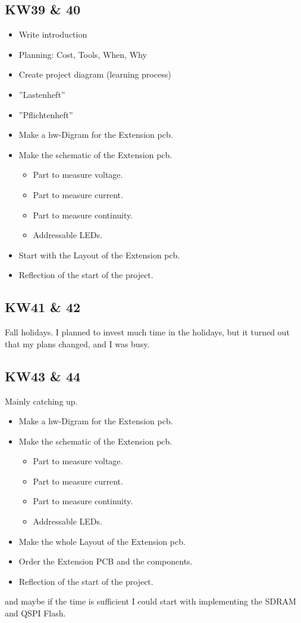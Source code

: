\subsection{KW39 \& 40}
\begin{itemize}
    \item Write introduction
    \item Planning: Cost, Tools, When, Why
    \item Create project diagram (learning process)
    \item ''Lastenheft''
    \item ''Pflichtenheft''
    \item Make a \acs{hw}-Digram for the Extension \acs{pcb}.
    \item Make the schematic of the Extension \acs{pcb}. 
    \begin{itemize}
        \item Part to measure voltage.
        \item Part to measure current.
        \item Part to measure continuity.
        \item Addressable LEDs.
    \end{itemize}
    \item Start with the Layout of the Extension \acs{pcb}.
    \item Reflection of the start of the project.
\end{itemize}




\subsection{KW41 \& 42}
Fall holidays. I planned to invest much time in the holidays, but it turned out that my plans changed, and I was busy.



\subsection{KW43 \& 44}
Mainly catching up.
\begin{itemize}
    \item Make a \acs{hw}-Digram for the Extension \acs{pcb}.
    \item Make the schematic of the Extension \acs{pcb}. 
    \begin{itemize}
        \item Part to measure voltage.
        \item Part to measure current.
        \item Part to measure continuity.
        \item Addressable LEDs.
    \end{itemize}
    \item Make the whole Layout of the Extension \acs{pcb}.
    \item Order the Extension PCB and the components.
    \item Reflection of the start of the project.
\end{itemize}
and maybe if the time is sufficient I could start with implementing the SDRAM and QSPI Flash.



